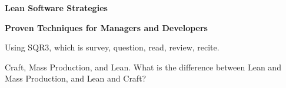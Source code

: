 


\centerline{\bf Lean Software Strategies}
\smallskip
\centerline{\bf Proven Techniques for Managers and Developers}
\bigskip
Using SQR3, which is survey, question, read, review, recite.
\bigskip
{}

 Craft, Mass Production, and Lean.
 What is the difference between Lean and Mass Production, and Lean and Craft?

\bye
